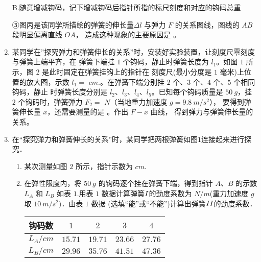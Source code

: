 \begin{enumerate}
B.随意增减钩码，记下增减钩码后指针所指的标尺刻度和对应的钩码总重


③图丙是该同学所描绘的弹簧的伸长量$ \Delta l $ 与弹力 $ F $ 的关系图线，图线的 $ AB $ 段明显偏离直线 $ OA $，
造成这种现象的主要原因是  。

\banswer{

}

\item 
{}
某同学在”探究弹力和弹簧伸长的关系”时，安装好实验装置，让刻度尺零刻度与弹簧上端平齐，在
弹簧下端挂 $ 1 $ 个钩码，静止时弹簧长度为 $ l_{1} $。如图 $ 1 $ 所示，图 $ 2 $ 是此时固定在弹簧挂钩上的指针在
刻度尺(最小分度是 $ 1 $ 毫米)上位置的放大图，示数 $ l_{1} = $  
$ cm $.。在弹簧下端分别挂 $ 2 $ 个、$ 3 $ 个、$ 4 $ 个、$ 5 $ 个相同钩码，静止
时弹簧长度分别是 $ l_{2} $、$ l_{3} $、$ l_{4} $、$ l_{5} $。已知每个钩码质量是 $ 50 \ g $，挂 $ 2 $
个钩码时，弹簧弹力 $ F_{2} = $
$ N $（当地重力加速度 $ g=9.8 \ m/s^{2} $），
要得到弹簧伸长量 $ x $，还需要测量的是
。作出 $ F-x $ 曲线，
得到弹力与弹簧伸长量的关系。
\begin{figure}[h!]
\centering

\end{figure}




\newpage
\item 
{}
在“探究弹力和弹簧伸长的关系”时，某同学把两根弹簧如图$ 1 $连接起来进行探究．


\begin{enumerate}
\renewcommand{\labelenumi}{\arabic{enumi}.}
\item
某次测量如图 $ 2 $ 所示，指针示数为  $ cm $.




\item 
在弹性限度内，将 $ 50 \ g $ 的钩码逐个挂在弹簧下端，得到指针 $ A $、$ B $ 的示数
$ L_A $ 和 $ L_B $ 如表 $ 1 $.用表 $ 1 $ 数据计算弹簧$ \lmd{1} $的劲度系数为  $ N/m $(重力加速度 $ g $
取 $ 10 \ m/s^{2}) $．由表 $ 1 $ 数据  (选填“能”或“不能”)计算出弹簧$ \lmd{2} $的劲度系数．
\begin{table}[h!]
\centering 
\begin{tabular}{|c|c|c|c|c|}
\hline 
钩码数 & $ 1 $ & $ 2 $ & $ 3 $ & $ 4 $
 \\
\hline
$ L_A/cm $ & $ 15.71 $ & $ 19.71 $ & $ 23.66 $ & $ 27.76 $
 \\
\hline
$ L_B/cm $ & $ 29.96 $ & $ 35.76 $ & $ 41.51 $ & $ 47.36 $\\ 
\hline 
\end{tabular}
\end{table} 



\end{enumerate}
\end{enumerate}
